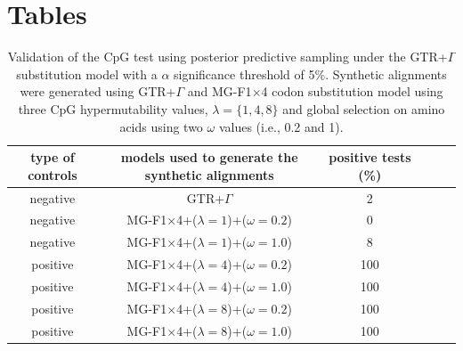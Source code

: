 \documentclass{article}
\begin{document}
\newpage
\section*{Tables}

\begin{table}[h]
    \begin{tabular}{cccccc}
    type of controls & models used to generate the synthetic alignments & positive tests (\%)\\
    \hline
    negative & GTR+$\Gamma$                              & 2\\
    negative & MG-F1$\times$4+($\lambda=1$)+($\omega=0.2$) & 0\\
    negative & MG-F1$\times$4+($\lambda=1$)+($\omega=1.0$) & 8\\
    positive & MG-F1$\times$4+($\lambda=4$)+($\omega=0.2$) & 100\\
    positive & MG-F1$\times$4+($\lambda=4$)+($\omega=1.0$) & 100\\
    positive & MG-F1$\times$4+($\lambda=8$)+($\omega=0.2$) & 100\\
    positive & MG-F1$\times$4+($\lambda=8$)+($\omega=1.0$) & 100\\
    \hline
    \end{tabular}
    \caption{Validation of the CpG test using posterior predictive sampling under the GTR+$\Gamma$ substitution model with a $\alpha$ significance threshold of 5\%. Synthetic alignments were generated using GTR+$\Gamma$ and MG-F1$\times$4 codon substitution model using three CpG hypermutability values, $\lambda = \{1,4,8\}$ and global selection on amino acids using two $\omega$ values (i.e., 0.2 and 1).}\label{tab:table_1}
\end{table}
\newpage


\end{document}
